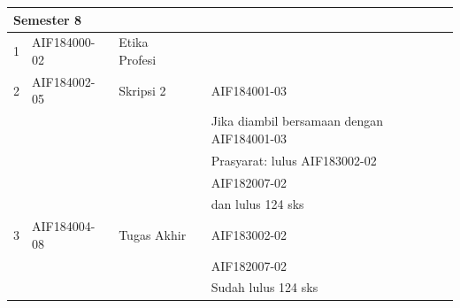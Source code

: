 \begin{table}[H]
\begin{tabular}{|p{0.5cm}|p{2.85cm}|p{4.95cm}|p{2.7cm}|p{2.7cm}|}
\multicolumn{5}{|l|}{\textbf{Semester 8}} \\ \hline
1 & AIF184000-02 & Etika Profesi &  &  \\ \hline
2 & AIF184002-05 & Skripsi 2 &  & AIF184001-03 \\ 
 &  &  &  & Jika diambil bersamaan dengan AIF184001-03 \\ 
 &  &  &  & Prasyarat: lulus AIF183002-02 \\ 
 &  &  &  & AIF182007-02 \\
 &  &  &  & dan lulus 124 sks \\ \hline
3 & AIF184004-08 & Tugas Akhir &  & AIF183002-02 \\ 
 &  &  &  & AIF182007-02 \\
 &  &  &  & Sudah lulus 124 sks \\ \hline
		\end{tabular}
	\label{tab:DaftarMataKuliahWajibDanPrasyaratnya2}
\end{table}

